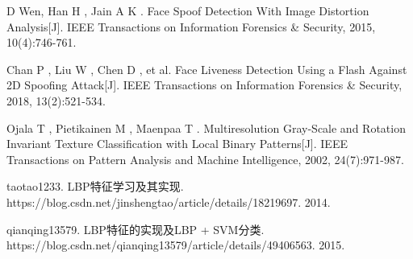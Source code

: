 \documentclass[conference]{IEEEtran}
\begin{document}
\begin{thebibliography}{99}

    D  Wen,  Han H ,  Jain A K . 
    Face Spoof Detection With Image Distortion Analysis[J]. 
    IEEE Transactions on Information Forensics \& Security, 2015, 10(4):746-761.
    
    Chan P ,  Liu W ,  Chen D , et al. 
    Face Liveness Detection Using a Flash Against 2D Spoofing Attack[J]. 
    IEEE Transactions on Information Forensics \& Security, 2018, 13(2):521-534.

    Ojala T , Pietikainen M , Maenpaa T .
    Multiresolution Gray-Scale and Rotation Invariant Texture Classification with Local Binary Patterns[J].
    IEEE Transactions on Pattern Analysis and Machine Intelligence, 2002, 24(7):971-987.

    taotao1233.
    LBP特征学习及其实现.
    https://blog.csdn.net/jinshengtao/article/details/18219697.
    2014.

    qianqing13579.
    LBP特征的实现及LBP + SVM分类.
    https://blog.csdn.net/qianqing13579/article/details/49406563.
    2015.

\end{thebibliography}
\end{document}
